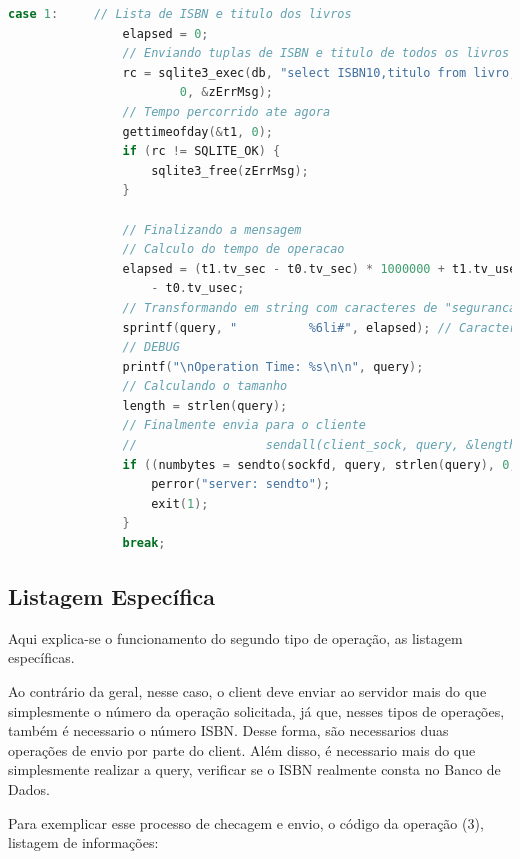 \documentclass[10pt,a4paper]{report}
\begin{document}
\begin{lstlisting}[language=C]
case 1:		// Lista de ISBN e titulo dos livros
				elapsed = 0;
				// Enviando tuplas de ISBN e titulo de todos os livros
				rc = sqlite3_exec(db, "select ISBN10,titulo from livro;", callback,
						0, &zErrMsg);
				// Tempo percorrido ate agora
				gettimeofday(&t1, 0);
				if (rc != SQLITE_OK) {
					sqlite3_free(zErrMsg);
				}

				// Finalizando a mensagem
				// Calculo do tempo de operacao
				elapsed = (t1.tv_sec - t0.tv_sec) * 1000000 + t1.tv_usec
					- t0.tv_usec;
				// Transformando em string com caracteres de "seguranca" para postumo atoi
				sprintf(query, "          %6li#", elapsed);	// Caractere # e um identificador de fim da mensagem
				// DEBUG
				printf("\nOperation Time: %s\n\n", query);
				// Calculando o tamanho
				length = strlen(query);
				// Finalmente envia para o cliente
				//					sendall(client_sock, query, &length);
				if ((numbytes = sendto(sockfd, query, strlen(query), 0,	(struct sockaddr *) &their_addr, addr_len)) == -1) {
					perror("server: sendto");
					exit(1);
				}
				break;
\end{lstlisting}

\subsection{Listagem Específica}
Aqui explica-se o funcionamento do segundo tipo de operação, as listagem específicas.

	Ao contrário da geral, nesse caso, o client deve enviar ao servidor mais do que simplesmente o número da operação solicitada, já que, nesses tipos de operações, também é necessario o número ISBN. Desse forma, são necessarios duas operações de envio por parte do client. Além disso, é necessario mais do que simplesmente realizar a query, verificar se o ISBN realmente consta no Banco de Dados.
	
	Para exemplicar esse processo de checagem e envio, o código da operação (3), listagem de informações:
\end{document}
